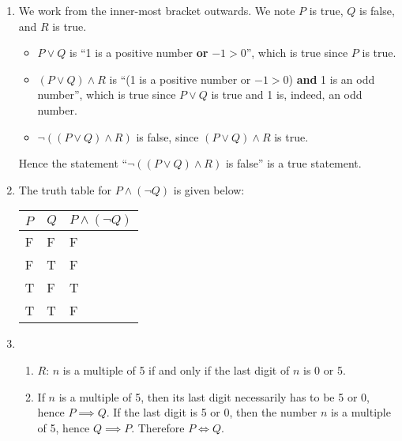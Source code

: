 \begin{enumerate}
    \item We work from the inner-most bracket outwards. We note $P$ is true, $Q$ is false, and $R$ is true.
    \begin{itemize}
        \item $P \lor Q$ is ``1 is a positive number \textbf{or} $-1 > 0$'', which is true since $P$ is true.
        \item $(P \lor Q) \land R$ is ``(1 is a positive number or $-1 > 0$) \textbf{and} 1 is an odd number'', which is true since $P \lor Q$ is true and 1 is, indeed, an odd number.
        \item $\lnot((P \lor Q) \land R)$ is false, since $(P \lor Q) \land R$ is true.
    \end{itemize}
    Hence the statement ``$\lnot((P \lor Q) \land R)$ is false'' is a true statement.
    
    \item The truth table for $P \land (\lnot Q)$ is given below:
    \begin{table}[h]
        \centering
        \begin{tabular}{|l|l||l|}
            \hline
            $P$ & $Q$ & $P\land (\lnot Q)$ \\ \hline
            F   & F   & F                  \\ \hline
            F   & T   & F                  \\ \hline
            T   & F   & T                  \\ \hline
            T   & T   & F                  \\ \hline
        \end{tabular}
    \end{table}
    
    \item \begin{enumerate}[label=(\roman*)]
        \item $R$: $n$ is a multiple of 5 if and only if the last digit of $n$ is 0 or 5.
        \item If $n$ is a multiple of 5, then its last digit necessarily has to be 5 or 0, hence $P \implies Q$. If the last digit is 5 or 0, then the number $n$ is a multiple of 5, hence $Q \implies P$. Therefore $P \iff Q$.
    \end{enumerate}
    

\end{enumerate}
